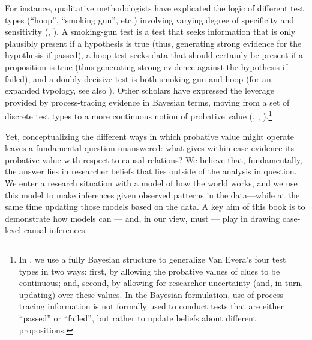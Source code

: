 \documentclass[12pt,]{book}
\let\rmarkdownfootnote\footnote%
\def\footnote{\protect\rmarkdownfootnote}
\begin{document}
For instance, qualitative methodologists have explicated the logic of different test types (``hoop'', ``smoking gun'', etc.) involving varying degree of specificity and sensitivity (\citet{collier2011understanding}, \citet{Mahony:Logic:2012}). A smoking-gun test is a test that seeks information that is only plausibly present if a hypothesis is true (thus, generating strong evidence for the hypothesis if passed), a hoop test seeks data that should certainly be present if a proposition is true (thus generating strong evidence against the hypothesis if failed), and a doubly decisive test is both smoking-gun and hoop (for an expanded typology, see also \citet{rohlfing2013comparative}). Other scholars have expressed the leverage provided by process-tracing evidence in Bayesian terms, moving from a set of discrete test types to a more continuous notion of probative value (\citet{fairfield2017explicit}, \citet{BennettAppendix}, \citet{humphreys2015mixing}).\footnote{In \citet{humphreys2015mixing}, we use a fully Bayesian structure to generalize Van Evera's four test types in two ways: first, by allowing the probative values of clues to be continuous; and, second, by allowing for researcher uncertainty (and, in turn, updating) over these values. In the Bayesian formulation, use of process-tracing information is not formally used to conduct tests that are either ``passed'' or ``failed'', but rather to update beliefs about different propositions.}

Yet, conceptualizing the different ways in which probative value might operate leaves a fundamental question unanswered: what gives within-case evidence its probative value with respect to causal relations? We believe that, fundamentally, the answer lies in researcher beliefs that lies outside of the analysis in question. We enter a research situation with a model of how the world works, and we use this model to make inferences given observed patterns in the data---while at the same time updating those models based on the data. A key aim of this book is to demonstrate how models can --- and, in our view, must --- play in drawing case-level causal inferences.
\end{document}
